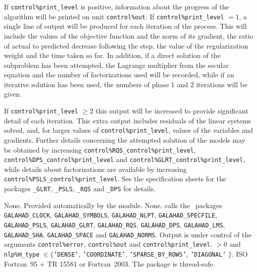 \documentclass{galahad}
\newcommand{\packagename}{ARC}
\begin{document}
\galinfo
If {\tt control\%print\_level} is positive, information about the progress
of the algorithm will be printed on unit {\tt control\-\%out}.
If {\tt control\%print\_level} $= 1$, a single line of output will be produced
for each iteration of the process.
This will include the values of the objective function and the norm of its
gradient, the ratio of actual to predicted decrease following the step, the
value of the regularization weight and the time taken so far. In addition, if
a direct solution of the subproblem has been attempted, the
Lagrange multiplier from the secular equation and the number of factorizations
used will be recorded, while if an iterative solution has been used, the
numbers of phase 1 and 2 iterations will be given.

If {\tt control\%print\_level} $\geq 2$ this
output will be increased to provide significant detail of each iteration.
This extra output includes residuals of the linear systems solved, and,
for larger values of {\tt control\%print\_level}, values of the variables
and gradients. Further details concerning the attempted solution of the models
may be obtained by increasing
{\tt control\%RQS\_control\%print\_level},
{\tt control\%DPS\_control\%print\_level}
and
{\tt control\%GLRT\_control\%print\-\_\-level},
while details about factorizations are available
by increasing
{\tt control\%PSLS\_control\%print\_level}.
See the specification sheets for the packages
{\tt \libraryname\_GLRT},
{\tt \libraryname\_PSLS},
{\tt \libraryname\_RQS} and
{\tt \libraryname\_DPS}
for details.


\galgeneral

\galcommon None.
\galworkspace Provided automatically by the module.
\galroutines None.
\galmodules {\tt \packagename\_solve} calls the \galahad\ packages
{\tt GALAHAD\_CLOCK},
{\tt GALAHAD\_SY\-M\-BOLS}, \sloppy
{\tt GALAHAD\_NLPT},
{\tt GALAHAD\_SPECFILE},
{\tt GALAHAD\_PSLS},
{\tt GALAHAD\_GLRT},
{\tt GALAHAD\_RQS},
{\tt GALAHAD\_DPS},
{\tt GALAHAD\_LMS},
{\tt GALAHAD\_SHA},
{\tt GALAHAD\_SPACE} and
{\tt GALAHAD\_NORMS}.
\galio Output is under control of the arguments
 {\tt control\%error}, {\tt control\%out} and {\tt control\%print\_level}.
 $> 0$ and
{\tt nlp\%H\_type} $\in \{${\tt 'DENSE'},
 {\tt 'COORDINATE'}, {\tt 'SPARSE\_BY\_ROWS'}, {\tt 'DIAGONAL'} $\}$.
\galportability ISO Fortran~95 + TR 15581 or Fortran~2003.
The package is thread-safe.
\end{document}
